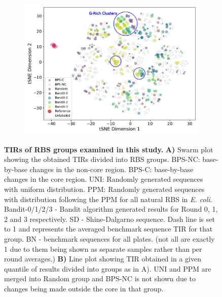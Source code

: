 \documentclass{article}
\begin{document}
\begin{figure}[!ht]
\begin{subfigure}[b]{0.48\textwidth}
    \end{subfigure}
    \begin{subfigure}[b]{0.48\textwidth}
        \centering
        \caption{}
        \includegraphics[scale=0.42]{plots/Main_Paper/tsneplot.pdf}
    \end{subfigure}
    \caption{
    \textbf{TIRs of RBS groups examined in this study.} 
    \textbf{A)} Swarm plot showing the obtained TIRs divided into RBS groups.
    BPS-NC: base-by-base changes in the non-core region. 
    BPS-C: base-by-base changes in the core region. 
    UNI: Randomly generated sequences with uniform distribution. 
    PPM: Randomly generated sequences with distribution following the PPM for all natural RBS in \emph{E. coli}. 
    Bandit-0/1/2/3 - Bandit algorithm generated results for Round 0, 1, 2 and 3 respectively.
    SD - Shine-Dalgarno sequence.
    Dash line is set to 1 and represents the averaged benchmark sequence TIR for that group. 
    BN - benchmark sequences for all plates. 
    (not all are exactly 1 due to them being shown as separate samples rather than per round averages.)
    \textbf{B)} Line plot showing TIR obtained in a given quantile of results divided into groups as in A).
    UNI and PPM are merged into Random group and BPS-NC is not shown due to changes being made outside the core in that group. 
}
\end{figure}
\end{document}

